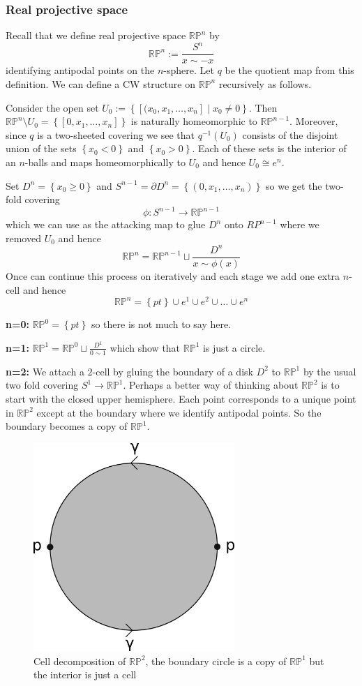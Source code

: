 \documentclass[11pt]{article}
\newcommand{\defeq}{:=}
\newcommand{\relmiddle}[1]{\mathrel{}\middle#1\mathrel{}}
\newcommand{\rmv}{\relmiddle|}
\newcommand{\RP}{\mathbb{R}\mathbb{P}}
\begin{document}
\subsubsection{Real projective space}
Recall that we define real projective space $\RP^n$ by
\[
	\RP^n\defeq\frac{S^n}{x\sim -x}
\]
identifying antipodal points on the $n$-sphere.
Let $q$ be the quotient map from this definition.
We can define a CW structure on $\RP^n$ recursively as follows.

Consider the open set $U_0\defeq\left\{\left[(x_0, x_1, \dots, x_n\right] \rmv x_0 \neq 0\right\}$.
Then $\RP^n\setminus U_0=\left\{\left[0, x_1, \dots, x_n\right]\right\}$ is naturally homeomorphic to $\RP^{n-1}$.
Moreover, since $q$ is a two-sheeted covering we see that $q^{-1}(U_0)$ consists of the disjoint union of the sets $\left\{x_0 < 0\right\}$ and $\left\{x_0 >0\right\}$.
Each of these sets is the interior of an $n$-balls and maps homeomorphically to $U_0$ and hence $U_0\cong e^n$.

Set $D^n=\left\{x_0 \geq 0\right\}$ and $S^{n-1}=\partial D^n=\left\{(0, x_1, \dots , x_n)\right\}$ so we get the two-fold covering
\[
	\phi:S^{n-1}\to\RP^{n-1}
\]
which we can use as the attacking map to glue $D^n$ onto $RP^{n-1}$ where we removed $U_0$ and hence
\[
	\RP^n=\RP^{n-1}\sqcup\frac{D^n}{x\sim \phi(x)}
\]
Once can continue this process on iteratively and each stage we add one extra $n$-cell and hence
\[
	\RP^n=\left\{pt\right\}\cup e^1 \cup e^2 \cup \dots \cup e^n
\]

\textbf{n=0:} $\RP^0=\left\{pt\right\}$ so there is not much to say here.

\textbf{n=1: }$\RP^1=\RP^0\sqcup \frac{D^1}{0\sim 1}$ which show that $\RP^1$ is just a circle.

\textbf{n=2: }We attach a $2$-cell by gluing the boundary of a disk $D^2$ to $\RP^1$ by the usual two fold covering $S^1\to\RP^1$.
Perhaps a better way of thinking about $\RP^2$ is to start with the closed upper hemisphere.
Each point corresponds to a unique point in $\RP^2$ except at the boundary where we identify antipodal points.
So the boundary becomes a copy of $\RP^1$.

\begin{figure}[ht]
	\centering
	\includegraphics[width=3in]{rp2.png}
	\caption{Cell decomposition of $\RP^2$, the boundary circle is a copy of $\RP^1$ but the interior is just a cell}
	\label{fig:rp2}
\end{figure}
\end{document}
